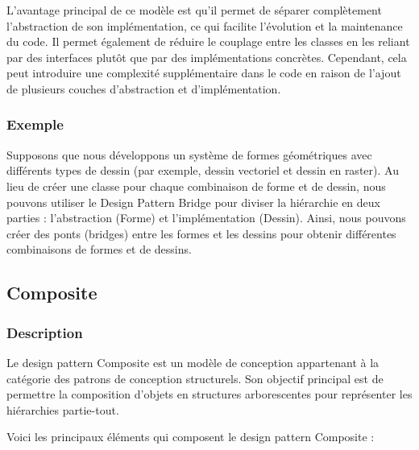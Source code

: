 \documentclass[french]{article}
\begin{document}
L'avantage principal de ce modèle est qu'il permet de séparer complètement l'abstraction de son implémentation, ce qui facilite l'évolution et la maintenance du code. Il permet également de réduire le couplage entre les classes en les reliant par des interfaces plutôt que par des implémentations concrètes. Cependant, cela peut introduire une complexité supplémentaire dans le code en raison de l'ajout de plusieurs couches d'abstraction et d'implémentation.


\subsubsection{Exemple}

Supposons que nous développons un système de formes géométriques avec différents types de dessin (par exemple, dessin vectoriel et dessin en raster). Au lieu de créer une classe pour chaque combinaison de forme et de dessin, nous pouvons utiliser le Design Pattern Bridge pour diviser la hiérarchie en deux parties : l'abstraction (Forme) et l'implémentation (Dessin). Ainsi, nous pouvons créer des ponts (bridges) entre les formes et les dessins pour obtenir différentes combinaisons de formes et de dessins.




\newpage

\subsection{Composite}

\subsubsection{Description}


Le design pattern Composite est un modèle de conception appartenant à la catégorie des patrons de conception structurels. Son objectif principal est de permettre la composition d'objets en structures arborescentes pour représenter les hiérarchies partie-tout.

Voici les principaux éléments qui composent le design pattern Composite :
\end{document}
